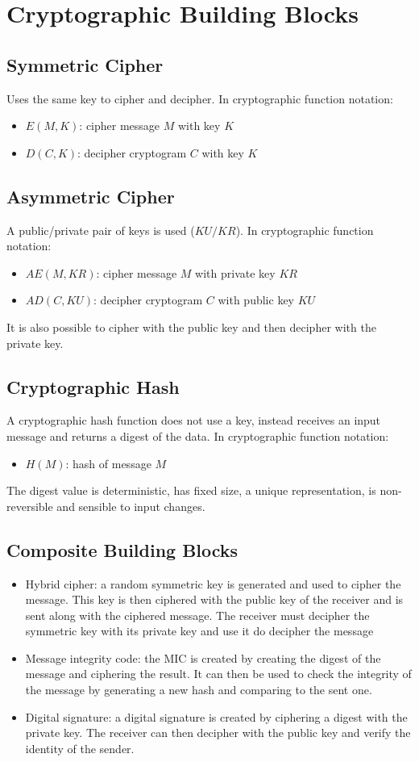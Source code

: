 \documentclass[10pt,a4paper]{report}
\begin{document}
\section{Cryptographic Building Blocks}
\subsection{Symmetric Cipher}
Uses the same key to cipher and decipher. In cryptographic function notation:
\begin{itemize}
\item $E(M,K)$: cipher message $M$ with key $K$
\item $D(C,K)$: decipher cryptogram $C$ with key $K$
\end{itemize}
\subsection{Asymmetric Cipher}
A public/private pair of keys is used ($KU/KR$). In cryptographic function notation:
\begin{itemize}
\item $AE(M, KR)$: cipher message $M$ with private key $KR$
\item $AD(C, KU)$: decipher cryptogram $C$ with public key $KU$
\end{itemize}
It is also possible to cipher with the public key and then decipher with the private key.
\subsection{Cryptographic Hash}
A cryptographic hash function does not use a key, instead receives an input message and returns a digest of the data. In cryptographic function notation:
\begin{itemize}
\item $H(M)$: hash of message $M$
\end{itemize}
The digest value is deterministic, has fixed size, a unique representation, is non-reversible and sensible to input changes.
\subsection{Composite Building Blocks}
\begin{itemize}
\item Hybrid cipher: a random symmetric key is generated and used to cipher the message. This key is then ciphered with the public key of the receiver and is sent along with the ciphered message. The receiver must decipher the symmetric key with its private key and use it do decipher the message
\item Message integrity code: the MIC is created by creating the digest of the message and ciphering the result. It can then be used to check the integrity of the message by generating a new hash and comparing to the sent one.
\item Digital signature: a digital signature is created by ciphering a digest with the private key. The receiver can then decipher with the public key and verify the identity of the sender.
\end{itemize}
\end{document}
